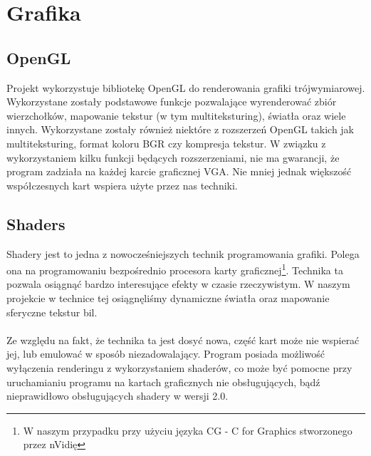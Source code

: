 \section{Grafika}
\subsection{OpenGL}

Projekt wykorzystuje bibliotekę OpenGL do renderowania grafiki trójwymiarowej. Wykorzystane zostały podstawowe funkcje
pozwalające wyrenderować zbiór wierzchołków, mapowanie tekstur (w tym multiteksturing), światła oraz wiele innych. 
Wykorzystane zostały również niektóre z rozszerzeń OpenGL takich jak multiteksturing, format koloru BGR czy kompresja tekstur. W związku z wykorzystaniem kilku funkcji będących rozszerzeniami, nie ma gwarancji, że program zadziała na każdej karcie graficznej VGA. Nie mniej jednak większość współczesnych kart wspiera użyte przez nas techniki.

\subsection{Shaders}

Shadery jest to jedna z nowocześniejszych technik programowania grafiki. Polega ona na programowaniu bezpośrednio procesora karty graficznej\footnote{W naszym przypadku przy użyciu języka CG - C for Graphics stworzonego przez nVidię}. Technika ta pozwala osiągnąć bardzo interesujące efekty w czasie rzeczywistym. W naszym projekcie w technice tej osiągnęliśmy dynamiczne światła oraz mapowanie sferyczne tekstur bil.\\ \\
Ze względu na fakt, że technika ta jest dosyć nowa, część kart może nie wspierać jej, lub emulować w sposób niezadowalający. Program posiada możliwość wyłączenia renderingu z wykorzystaniem shaderów, co może być pomocne przy uruchamianiu programu na kartach graficznych nie obsługujących, bądź nieprawidłowo obsługujących shadery w wersji 2.0.